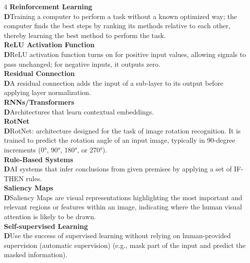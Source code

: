 \documentclass[8pt]{extarticle}
\newcommand{\dtag}{\textcolor{definitioncolor}{\tiny\textbf{D}}\;}
\begin{document}
\begin{multicols}{4}
\vspace{2pt}\textbf{Reinforcement Learning}\\
\dtag Training a computer to perform a task without a known optimized way; the computer finds the best steps by ranking its methods relative to each other, thereby learning the best method to perform the task.\\
\vspace{2pt}\textbf{ReLU Activation Function}\\
\dtag ReLU activation function turns on for positive input values, allowing signals to pass unchanged; for negative inputs, it outputs zero.\\
\vspace{2pt}\textbf{Residual Connection}\\
\dtag A residual connection adds the input of a sub-layer to its output before applying layer normalization.\\
\vspace{2pt}\textbf{RNNs/Transformers}\\
\dtag Architectures that learn contextual embeddings.\\
\vspace{2pt}\textbf{RotNet}\\
\dtag RotNet: architecture designed for the task of image rotation recognition. It is trained to predict the rotation angle of an input image, typically in 90-degree increments (0°, 90°, 180°, or 270°).\\
\vspace{2pt}\textbf{Rule-Based Systems}\\
\dtag AI systems that infer conclusions from given premises by applying a set of IF-THEN rules.\\
\vspace{2pt}\textbf{Saliency Maps}\\
\dtag Saliency Maps are visual representations highlighting the most important and relevant regions or features within an image, indicating where the human visual attention is likely to be drawn.\\
\vspace{2pt}\textbf{Self-supervised Learning}\\
\dtag Use the success of supervised learning without relying on human-provided supervision (automatic supervision) (e.g., mask part of the input and predict the masked information).\\


\end{multicols}
\end{document}
